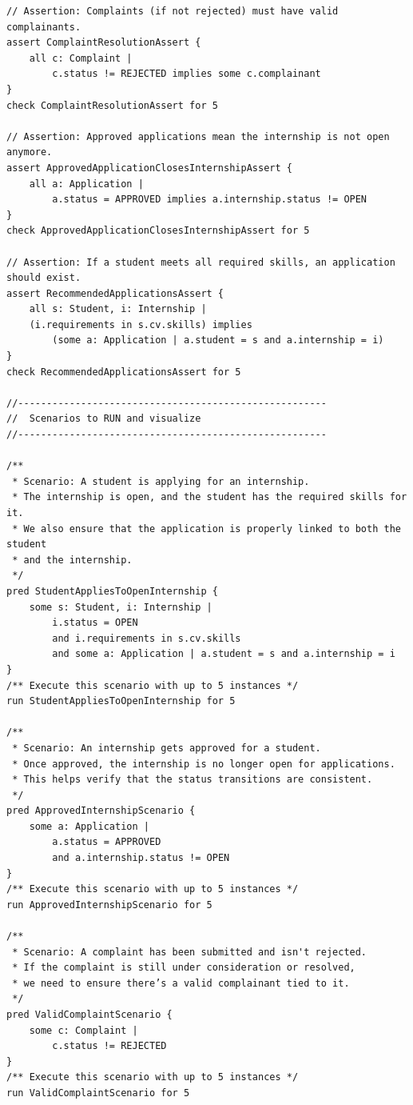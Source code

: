 \begin{lstlisting}
// Assertion: Complaints (if not rejected) must have valid complainants.
assert ComplaintResolutionAssert {
	all c: Complaint |
    	c.status != REJECTED implies some c.complainant
}
check ComplaintResolutionAssert for 5

// Assertion: Approved applications mean the internship is not open anymore.
assert ApprovedApplicationClosesInternshipAssert {
	all a: Application |
    	a.status = APPROVED implies a.internship.status != OPEN
}
check ApprovedApplicationClosesInternshipAssert for 5

// Assertion: If a student meets all required skills, an application should exist.
assert RecommendedApplicationsAssert {
	all s: Student, i: Internship |
  	(i.requirements in s.cv.skills) implies
    	(some a: Application | a.student = s and a.internship = i)
}
check RecommendedApplicationsAssert for 5

//------------------------------------------------------
//  Scenarios to RUN and visualize
//------------------------------------------------------

/**
 * Scenario: A student is applying for an internship.
 * The internship is open, and the student has the required skills for it.
 * We also ensure that the application is properly linked to both the student
 * and the internship.
 */
pred StudentAppliesToOpenInternship {
	some s: Student, i: Internship |
    	i.status = OPEN
    	and i.requirements in s.cv.skills
    	and some a: Application | a.student = s and a.internship = i
}
/** Execute this scenario with up to 5 instances */
run StudentAppliesToOpenInternship for 5

/**
 * Scenario: An internship gets approved for a student.
 * Once approved, the internship is no longer open for applications.
 * This helps verify that the status transitions are consistent.
 */
pred ApprovedInternshipScenario {
	some a: Application |
    	a.status = APPROVED
    	and a.internship.status != OPEN
}
/** Execute this scenario with up to 5 instances */
run ApprovedInternshipScenario for 5

/**
 * Scenario: A complaint has been submitted and isn't rejected.
 * If the complaint is still under consideration or resolved,
 * we need to ensure there’s a valid complainant tied to it.
 */
pred ValidComplaintScenario {
	some c: Complaint |
    	c.status != REJECTED
}
/** Execute this scenario with up to 5 instances */
run ValidComplaintScenario for 5

\end{lstlisting}

